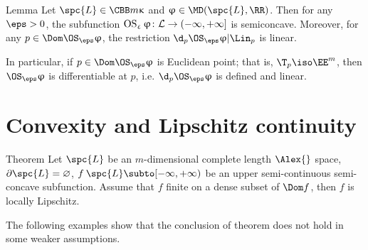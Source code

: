\begin{thm}{Lemma}
Let $\spc{L}\in\CBB m\kappa$ and $\phi\in\MD(\spc{L},\RR)$.
Then for any $\eps>0$, the subfunction $\OS_\eps\phi\:\spc{L}\to(-\infty,+\infty]$ is semiconcave. 
Moreover, for any $p\in \Dom \OS_\eps\phi$, 
the restriction $\d_p\OS_\eps\phi|\Lin_p$ is linear.

In particular, if $p\in \Dom \OS_\eps\phi$ is Euclidean point; that is, $\T_p\iso\EE^m$, then $\OS_\eps\phi$ is differentiable at $p$, i.e. $\d_p\OS_\eps\phi$ is defined and linear.
\end{thm}














































\section{Convexity and Lipschitz continuity}

\begin{thm}{Theorem}\label{thm:cont=>lip}
Let $\spc{L}$ be an $m$-dimensional complete length $\Alex{}$ space,
$\partial \spc{L}=\emptyset$,
$f\:\spc{L}\subto[-\infty,+\infty)$ be an upper semi-continuous semi-concave subfunction.
Assume that $f$ finite on a dense subset of $\Dom f$,
then $f$ is locally Lipschitz.
\end{thm}

The following examples show that the conclusion of theorem does not hold in some weaker assumptions.

